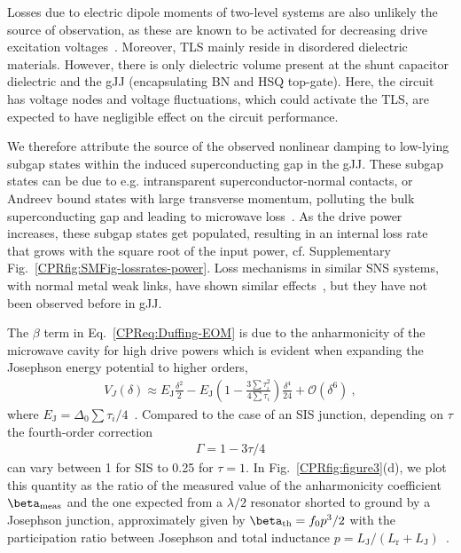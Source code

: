 Losses due to electric dipole moments of two-level systems are also unlikely the source of observation, as these are known to be activated for decreasing drive excitation voltages~\cite{martinisDecoherenceJosephsonQubits2005c,oconnellMicrowaveDielectricLoss2008a,gunnarssonDielectricLossesMultilayer2013}.
%
Moreover, TLS mainly reside in disordered dielectric materials.
%
However, there is only dielectric volume present at the shunt capacitor dielectric and the gJJ (encapsulating BN and HSQ top-gate).
%
Here, the circuit has voltage nodes and voltage fluctuations, which could activate the TLS, are expected to have negligible effect on the circuit performance.

We therefore attribute the source of the observed nonlinear damping to low-lying subgap states within the induced superconducting gap in the gJJ.
%
These subgap states can be due to e.g. intransparent superconductor-normal contacts, or Andreev bound states with large transverse momentum, polluting the bulk superconducting gap and leading to microwave loss~\cite{schmidtBallisticGrapheneSuperconducting2018}.
%
As the drive power increases, these subgap states get populated, resulting in an internal loss rate that grows with the square root of the input power, cf. Supplementary Fig.~\ref{CPRfig:SMFig-lossrates-power}.
%
Loss mechanisms in similar SNS systems, with normal metal weak links, have shown similar effects~\cite{fuechsleEffectMicrowavesCurrentPhase2009,dassonnevilleDissipationSupercurrentFluctuations2013}, but they have not been observed before in gJJ.

The $\beta$ term in Eq.~\ref{CPReq:Duffing-EOM} is due to the anharmonicity of the microwave cavity for high drive powers which is evident when expanding the Josephson energy potential to higher orders,
\begin{align}
V_J(\delta) \approx E_\text{J} \frac{\delta^2}{2} - E_\text{J}\left( 1-\frac{3\sum\tau_i^2}{4\sum\tau_i} \right) \frac{\delta^4}{24} +\mathcal{O}(\delta^6)\ , 
\label{CPReq:EJtaylor}
\end{align}
%
where $E_\text{J}=\Delta_0\sum\tau_i/4$~\cite{kringhojAnharmonicitySuperconductingQubit2018}.
%
Compared to the case of an SIS junction, depending on $\tau$ the fourth-order correction 
%
\begin{align}
\Gamma = 1-3\tau/4
\label{CPReq:Ejcorrection}
\end{align} 
%
can vary between 1 for SIS to 0.25 for $\tau=1$.
%
In Fig.~\ref{CPRfig:figure3}(d), we plot this quantity as the ratio of the measured value of the anharmonicity coefficient $\beta_{\rm meas}$ and the one expected from a $\lambda/2$ resonator shorted to ground by a Josephson junction, approximately given by $\beta_{\rm th}=f_0p^3/2$ with the participation ratio between Josephson and total inductance $p=L_\text{J}/(L_\text{r}+L_\text{J})$~\cite{wilsonPhotonGenerationElectromagnetic2010b,zhouHighgainWeaklyNonlinear2014}.


